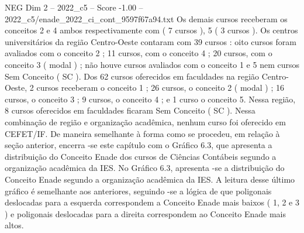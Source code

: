 \begin{textsample}{NEG Dim 2 – 2022\_c5 – Score -1.00 – 2022\_c5/enade\_2022\_ci\_cont\_9597f67a94.txt}
Os demais cursos receberam os conceitos 2 e 4 ambos respectivamente com ( 7 cursos ), 5 ( 3 cursos ).
Os centros universitários da região Centro-Oeste contaram com 39 cursos : oito cursos foram avaliados com o conceito 2 ; 11 cursos, com o conceito 4 ; 20 cursos, com o conceito 3 ( modal ) ; não houve cursos avaliados com o conceito 1 e 5 nem cursos Sem Conceito ( SC ).
Dos 62 cursos oferecidos em faculdades na região Centro-Oeste, 2 cursos receberam o conceito 1 ; 26 cursos, o conceito 2 ( modal ) ; 16 cursos, o conceito 3 ; 9 cursos, o conceito 4 ; e 1 curso o conceito 5.
Nessa região, 8 cursos oferecidos em faculdades ficaram Sem Conceito ( SC ).
Nessa combinação de região e organização acadêmica, nenhum curso foi oferecido em CEFET/IF.
De maneira semelhante à forma como se procedeu, em relação à seção anterior, encerra -se este capítulo com o Gráfico 6.3, que apresenta a distribuição do Conceito Enade dos cursos de Ciências Contábeis segundo a organização acadêmica da IES.
No Gráfico 6.3, apresenta -se a distribuição do Conceito Enade segundo a organização acadêmica da IES.
A leitura desse último gráfico é semelhante aos anteriores, seguindo -se a lógica de que poligonais deslocadas para a esquerda correspondem a Conceito Enade mais baixos ( 1, 2 e 3 ) e poligonais deslocadas para a direita correspondem ao Conceito Enade mais altos.

\end{textsample}
